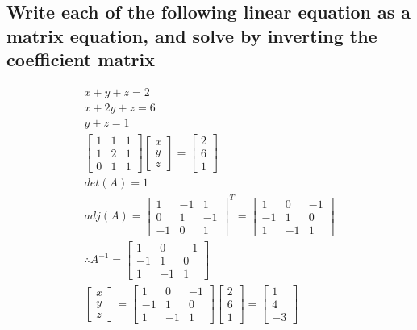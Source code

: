 \documentclass[12pt,a4paper]{article}
\begin{document}
\subsection{Write each of the following linear equation as a matrix equation, and solve by inverting the coefficient matrix} 
\begin{gather*}
x + y + z = 2\\
x +2y + z = 6\\
y + z = 1\\
\begin{bmatrix}
1&1&1\\1&2&1\\0&1&1
\end{bmatrix}
\begin{bmatrix}
x\\y\\z
\end{bmatrix}
=
\begin{bmatrix}
2\\6\\1
\end{bmatrix}\\
det(A) = 1\\
adj(A) = 
\begin{bmatrix}
1&-1&1\\0&1&-1\\-1&0&1
\end{bmatrix}^T=
\begin{bmatrix}
1&0&-1\\-1&1&0\\1&-1&1
\end{bmatrix}\\
\therefore A^{-1} = 
\begin{bmatrix}
1&0&-1\\-1&1&0\\1&-1&1
\end{bmatrix}\\
\begin{bmatrix}
x\\y\\z
\end{bmatrix}
=
\begin{bmatrix}
1&0&-1\\-1&1&0\\1&-1&1
\end{bmatrix}
\begin{bmatrix}
2\\6\\1
\end{bmatrix}
=
\begin{bmatrix}
1\\4\\-3
\end{bmatrix}
\end{gather*}
\end{document}
